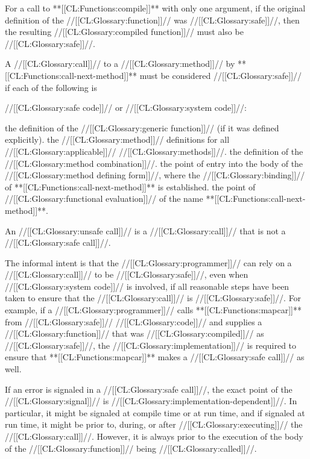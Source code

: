 \itemitem{\bull} For a call to **[[CL:Functions:compile]]** with only one argument, if the original definition of the //[[CL:Glossary:function]]// was //[[CL:Glossary:safe]]//, then the resulting //[[CL:Glossary:compiled function]]// must also be //[[CL:Glossary:safe]]//.

\itemitem{\bull} A //[[CL:Glossary:call]]// to a //[[CL:Glossary:method]]// by **[[CL:Functions:call-next-method]]** must be  considered //[[CL:Glossary:safe]]// if each of the following is  

//[[CL:Glossary:safe code]]// or //[[CL:Glossary:system code]]//:

\beginlist

\itemitem{--} the definition of the //[[CL:Glossary:generic function]]// (if it was defined explicitly). \itemitem{--} the //[[CL:Glossary:method]]// definitions for all //[[CL:Glossary:applicable]]// //[[CL:Glossary:methods]]//. \itemitem{--} the definition of the //[[CL:Glossary:method combination]]//. \itemitem{--} the point of entry into the body of the //[[CL:Glossary:method defining form]]//, 	      where the //[[CL:Glossary:binding]]// of **[[CL:Functions:call-next-method]]** is established. \itemitem{--} the point of //[[CL:Glossary:functional evaluation]]// of the name **[[CL:Functions:call-next-method]]**. \endlist

\endlist

An //[[CL:Glossary:unsafe call]]// is a //[[CL:Glossary:call]]// that is not a //[[CL:Glossary:safe call]]//.

The informal intent is that the //[[CL:Glossary:programmer]]// can rely on a //[[CL:Glossary:call]]// to be //[[CL:Glossary:safe]]//, even when //[[CL:Glossary:system code]]// is involved, if all reasonable steps have been taken to ensure that the //[[CL:Glossary:call]]// is //[[CL:Glossary:safe]]//. For example, if a //[[CL:Glossary:programmer]]// calls **[[CL:Functions:mapcar]]** from //[[CL:Glossary:safe]]// //[[CL:Glossary:code]]// and supplies a //[[CL:Glossary:function]]// that was //[[CL:Glossary:compiled]]//  as //[[CL:Glossary:safe]]//, the //[[CL:Glossary:implementation]]// is required to ensure that **[[CL:Functions:mapcar]]** makes a //[[CL:Glossary:safe call]]// as well.

 

If an error is signaled in a //[[CL:Glossary:safe call]]//, the exact point of the //[[CL:Glossary:signal]]// is //[[CL:Glossary:implementation-dependent]]//. In particular, it might be signaled at compile time or at run time, and if signaled at run time,  it might be prior to, during, or after //[[CL:Glossary:executing]]// the //[[CL:Glossary:call]]//. However, it is always prior to the execution of the body of the //[[CL:Glossary:function]]//  being //[[CL:Glossary:called]]//.

